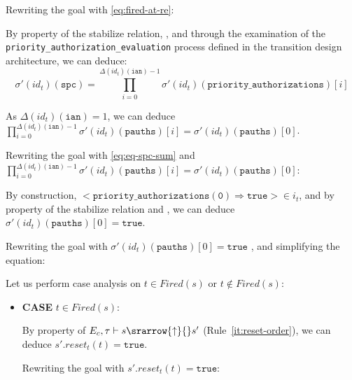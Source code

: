 \documentclass[dvipsnames,12pt]{article}
\begin{document}
\begin{niproof}
\begin{itemize}
    Rewriting the goal with \eqref{eq:fired-at-re}:\\

    By property of the stabilize relation, \InCsCompT, and through the
    examination of the \texttt{priority_authorization_evaluation}
    process defined in the transition design architecture, we can
    deduce:
    \begin{equation}
      \sigma'(id_t)(\texttt{spc})=\prod\limits_{i=0}^{\Delta(id_t)(\texttt{ian})-1}\sigma'(id_t)(\texttt{priority\_authorizations})[i]\label{eq:eq-spc-sum}
    \end{equation}

    As $\Delta(id_t)(\texttt{ian})=1$, we can deduce
    $\prod\limits_{i=0}^{\Delta(id_t)(\texttt{ian})-1}\sigma'(id_t)(\texttt{pauths})[i]=\sigma'(id_t)(\texttt{pauths})[0]$.

    Rewriting the goal with \eqref{eq:eq-spc-sum} and
    $\prod\limits_{i=0}^{\Delta(id_t)(\texttt{ian})-1}\sigma'(id_t)(\texttt{pauths})[i]=\sigma'(id_t)(\texttt{pauths})[0]$:\\
    
    By construction,
    ${<}\mathtt{priority\_authorizations(0)\Rightarrow{}true}{>}\in{}i_t$,
    and by property of the stabilize relation and \InCsCompT, we can
    deduce\\ $\sigma'(id_t)(\texttt{pauths})[0]=\mathtt{true}$.
    
    Rewriting the goal with $\sigma'(id_t)(\texttt{pauths})[0]=\mathtt{true}$
    , and simplifying the equation:\\
    
    Let us perform case analysis on $t\in{}Fired(s)$ or
    $t\notin{}Fired(s)$:

    \begin{itemize}
    \item \textbf{CASE} $t\in{}Fired(s)$:
      
      By property of
      $E_c,\tau\vdash{}s\srarrow{\uparrow}{\fontsize{7}{7}\selectfont}s'$
      (Rule~\ref{it:reset-order}), we can deduce
      $s'.reset_t(t)=\mathtt{true}$.

      Rewriting the goal with $s'.reset_t(t)=\mathtt{true}$:


\end{itemize}
\end{itemize}
\end{niproof}
\end{document}
